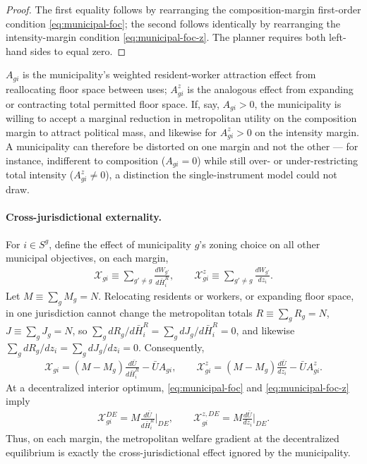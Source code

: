 \documentclass[12pt, a4paper]{article}
\theoremstyle{definition}
\theoremstyle{remark}
\begin{document}
\begin{proof}
The first equality follows by rearranging the composition-margin first-order condition \eqref{eq:municipal-foc}; the second follows identically by rearranging the intensity-margin condition \eqref{eq:municipal-foc-z}. The planner requires both left-hand sides to equal zero.
\end{proof}

$A_{gi}$ is the municipality's weighted resident-worker attraction effect from reallocating floor space between uses; $A_{gi}^z$ is the analogous effect from expanding or contracting total permitted floor space. If, say, $A_{gi}>0$, the municipality is willing to accept a marginal reduction in metropolitan utility on the composition margin to attract political mass, and likewise for $A_{gi}^z>0$ on the intensity margin. A municipality can therefore be distorted on one margin and not the other — for instance, indifferent to composition ($A_{gi}=0$) while still over- or under-restricting total intensity ($A_{gi}^z\neq0$), a distinction the single-instrument model could not draw.

\paragraph{Cross-jurisdictional externality.}
For $i\in S^g$, define the effect of municipality $g$'s zoning choice on all other municipal objectives, on each margin,
\begin{align}
    \label{eq:zoning-externality}
    \mathcal X_{gi}
    \equiv
    \sum_{g'\neq g}
    \frac{dW_{g'}}{d\bar H_i^R},
    \qquad
    \mathcal X_{gi}^z
    \equiv
    \sum_{g'\neq g}
    \frac{dW_{g'}}{dz_i}.
\end{align}
Let $M\equiv\sum_gM_g=N$. Relocating residents or workers, or expanding floor space, in one jurisdiction cannot change the metropolitan totals $R\equiv\sum_gR_g=N$, $J\equiv\sum_gJ_g=N$, so $\sum_g dR_g/d\bar H_i^R=\sum_g dJ_g/d\bar H_i^R=0$, and likewise $\sum_g dR_g/dz_i=\sum_g dJ_g/dz_i=0$. Consequently,
\begin{align}
    \label{eq:zoning-externality-expanded}
    \mathcal X_{gi}
    =
    (M-M_g)\frac{d\bar U}{d\bar H_i^R}
    -
    \bar U A_{gi},
    \qquad
    \mathcal X_{gi}^z
    =
    (M-M_g)\frac{d\bar U}{dz_i}
    -
    \bar U A_{gi}^z.
\end{align}
At a decentralized interior optimum, \eqref{eq:municipal-foc} and \eqref{eq:municipal-foc-z} imply
\begin{align}
    \label{eq:zoning-externality-at-DE}
    \mathcal X_{gi}^{DE}
    =
    M\frac{d\bar U}{d\bar H_i^R}\bigg|_{DE},
    \qquad
    \mathcal X_{gi}^{z,DE}
    =
    M\frac{d\bar U}{dz_i}\bigg|_{DE}.
\end{align}
Thus, on each margin, the metropolitan welfare gradient at the decentralized equilibrium is exactly the cross-jurisdictional effect ignored by the municipality.
\end{document}
